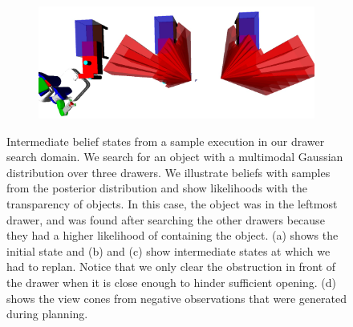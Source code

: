 \begin{figure}
\begin{subfigure}[b]{0.48\linewidth}
    \caption{}
    \label{fig:step4}
  \end{subfigure}
  \begin{subfigure}[b]{0.48\linewidth}
    \includegraphics[width=\textwidth]{drawer_images/drawer_dist_negreg.png}
    \caption{}
    \label{fig:step5}
  \end{subfigure}
  \caption{Intermediate belief states from a sample execution in our
    drawer search domain. We search for an object with a multimodal
    Gaussian distribution over three drawers. We illustrate beliefs with
    samples from the posterior distribution and show likelihoods with
    the transparency of objects. In this case, the object was in the
    leftmost drawer, and was found after searching the other
    drawers because they had a higher likelihood of containing the object. (a) shows the initial state and (b) and (c) show
    intermediate states at which we had to replan. Notice that we only clear
    the obstruction in front of the drawer when it is close enough to hinder sufficient opening.
    (d) shows the view cones from negative observations that were generated during planning.}
  \label{fig:drawerimgs}
\end{figure}

